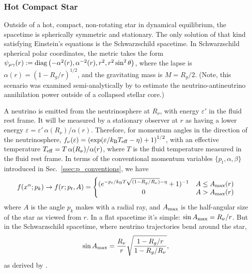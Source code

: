 \subsubsection{Hot Compact Star}
\label{sssc:f_af_sphere}
Outside of a hot, compact, non-rotating star in dynamical equilibrium, the
spacetime is spherically symmetric and stationary. The only solution of that
kind satisfying Einstein's equations is the Schwarzschild spacetime.
In Schwarzschild spherical polar coordinates, the metric takes the form
$\psi_{\mu\gamma}(r):={\rm diag}\left(-\alpha^2(r),\alpha^{-2}(r),r^2,r^2\sin^2\theta\right)$,
where the lapse is $\alpha(r)=(1-R_g/r)^{1/2}$, and the gravitating mass is
$M=R_g/2$.
(Note, this scenario was examined semi-analytically by
\citet{asan2000-nunubar}
to estimate the neutrino-antineutrino annihilation power outside of a collapsed
stellar core.)

A neutrino is emitted from the neutrinosphere at $R_\nu$, with energy
$\varepsilon'$ in the fluid rest frame.
It will be measured by a stationary observer at $r$
as having a lower energy
$\varepsilon=\varepsilon' \, \alpha(R_\nu)/\alpha(r)$.
Therefore, for momentum angles in the direction of the neutrinosphere,
$f_\nu(\varepsilon)=\left(\exp(\varepsilon/k_{\rm B}T_{\rm eff}-\eta)+1\right)^{1/2}$,
with an effective temperature $T_{\rm eff}=T \, \alpha(R_\nu)/\alpha(r)$,
where $T$ is the fluid temperature measured in the fluid rest frame.
In terms of the conventional momentum variables $\{p_t,\alpha,\beta\}$
introduced in Sec.~\ref{ssec:p_conventions}, we have
\begin{equation}
  \label{eqn:asano_fukuyama_f}
  f(x^\alpha;p_k) \rightarrow f(r;p_t,A)
  =\left\{
  \begin{matrix}
    (e^{-p_t/k_{\rm B}T\sqrt{(1-R_g/R_\nu)}-\eta}+1)^{-1} & A \leq A_{\rm max}(r) \\
    0                                                            & A > A_{\rm max}(r)
  \end{matrix}
  \right.
\end{equation}
where $A$ is the angle $p_k$ makes with a radial ray, and
$A_{\rm max}$ is the half-angular size of the star as viewed from $r$.
In a flat spacetime it's simple: $\sin A_{\rm max} = R_\nu/r$.
But in the Schwarzschild spacetime, where neutrino trajectories bend around the
star,
\begin{equation}
  \label{eqn:angular_extent}
  \sin A_{\rm max} = \frac{R_\nu}{r} \sqrt{\frac{1-R_g/r}{1-R_g/R_\nu}},
\end{equation}
as derived by \citet{asan2000-nunubar}.

